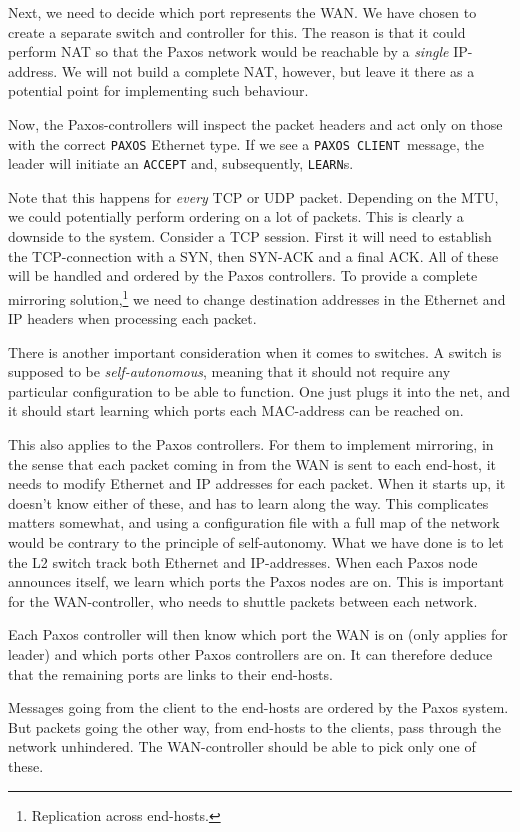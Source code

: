 Next, we need to decide which port represents the \ac{WAN}.
We have chosen to create a separate switch and controller for this.
The reason is that it could perform \acf{NAT} so that the Paxos network
would be reachable by a \textit{single} \acs{IP}-address.
We will not build a complete \acs{NAT}, however, but leave it there as a
potential point for implementing such behaviour.

Now, the Paxos-controllers will inspect the packet headers and act only on
those with the correct \texttt{PAXOS} Ethernet type.  If we see a
\texttt{PAXOS CLIENT} message, the leader will initiate an \texttt{ACCEPT}
and, subsequently, \texttt{LEARN}s.

Note that this happens for \textit{every} \ac{TCP} or \ac{UDP} packet.
Depending on the \ac{MTU}, we could potentially perform ordering on a lot of
packets.  This is clearly a downside to the system.  Consider a \acs{TCP}
session. First it will need to establish the \acs{TCP}-connection with a
SYN, then SYN-ACK and a final ACK.
All of these will be handled and ordered by the Paxos controllers.
To provide a complete mirroring solution,\footnote{Replication across
end-hosts.} we need to change destination addresses in the Ethernet and
\ac{IP} headers when processing each packet.

There is another important consideration when it comes to switches.
A switch is supposed to be \textit{self-autonomous}, meaning that it should
not require any particular configuration to be able to function. One just
plugs it into the net, and it should start learning which ports each
MAC-address can be reached on.  

This also applies to the Paxos controllers. For them to implement mirroring,
in the sense that each packet coming in from the \ac{WAN} is sent to
each end-host, it needs to modify Ethernet and IP addresses for each packet.
When it starts up, it doesn't know either of these, and has to learn along
the way.  This complicates matters somewhat, and using a configuration file
with a full map of the network would be contrary to the principle of
self-autonomy.  What we have done is to let the L2 switch track both
Ethernet and IP-addresses. When each Paxos node announces itself, we learn
which ports the Paxos nodes are on. This is important for the
WAN-controller, who needs to shuttle packets between each network.

Each Paxos controller will then know which port the WAN is on (only applies
for leader) and which ports other Paxos controllers are on. It can therefore
deduce that the remaining ports are links to their end-hosts.

Messages going from the client to the end-hosts are ordered by the Paxos
system. But packets going the other way, from end-hosts to the clients, pass
through the network unhindered.  The WAN-controller should be able to pick
only one of these.


